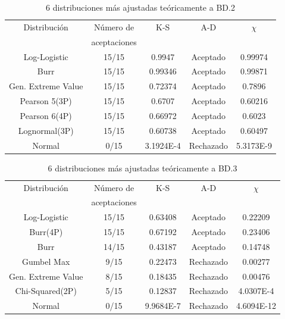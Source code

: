 \documentclass[12pt]{report}
\begin{document}
\begin{table}[h!]
	\centering
	\begin{tabular}{|c|c|c|c|c|}			
		\hline
		Distribución	  &Número de	&K-S	&A-D	& $\chi$  \\
							&	aceptaciones &     &	 &     \\ \hline
		Log-Logistic    &    15/15    & 0.9947   & 	Aceptado     &0.99974    \\ \hline
		Burr &    15/15	& 0.99346    &  Aceptado   	& 0.99871   \\ \hline
		Gen. Extreme Value &    15/15	& 0.72374  	&  Aceptado 	&   0.7896 	\\ \hline 
		Pearson 5(3P)  &    15/15	& 0.6707   &   Aceptado	& 0.60216   	\\ \hline
		Pearson 6(4P)  &   15/15	&     0.66972   &      	Aceptado   &  0.6023  	\\ \hline
		Lognormal(3P)   &   15/15	& 0.60738    &   	Aceptado	& 0.60497    	\\ \hline
		Normal   &   0/15	& 3.1924E-4   &   	Rechazado	& 5.3173E-9	\\ \hline  %
	\end{tabular}
	\caption{6 distribuciones más ajustadas teóricamente a BD.2}
	\label{teo_BD2}
\end{table}



\begin{table}[h!]
	\centering
	\begin{tabular}{|c|c|c|c|c|}			
		\hline
		Distribución	  &Número de	&K-S	&A-D	& $\chi$  \\
		&	aceptaciones &     &	 &     \\ \hline
		Log-Logistic    &    15/15    & 0.63408   & 	Aceptado     &0.22209    \\ \hline
		Burr(4P) &    15/15	& 0.67192    &  Aceptado   	& 0.23406   \\ \hline
		Burr &    14/15	& 0.43187	&  Aceptado 	&   0.14748	\\ \hline 
		Gumbel Max  &    9/15	& 0.22473  &   Rechazado	& 0.00277   	\\ \hline
		Gen. Extreme Value  &   8/15	&     0.18435   &      	Rechazado   &  0.00476	\\ \hline
		Chi-Squared(2P)   &   5/15	& 0.12837    &   	Rechazado	& 4.0307E-4   	\\ \hline
		Normal   &   0/15	& 9.9684E-7    &   	Rechazado	& 4.6094E-12	\\ \hline %
	\end{tabular}
	\caption{6 distribuciones más ajustadas teóricamente a BD.3}
	\label{teo_BD3}
\end{table}
\end{document}
